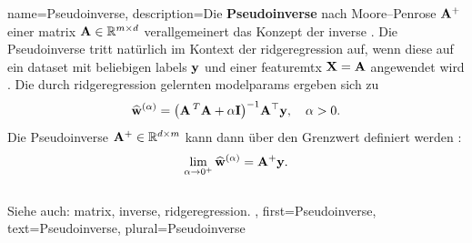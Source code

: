 \makeglossaries


{name={Pseudoinverse},
  description={Die \textbf{Pseudoinverse} nach Moore–Penrose ${\bf A}^{+}$ 
  	einer \gls{matrix} ${\bf A} \in \mathbb{R}^{m \times d}$ verallgemeinert das Konzept der 
  	\gls{inverse} \cite{GolubVanLoanBook}. Die Pseudoinverse\cite{unikassel} tritt natürlich im Kontext der 
  	\gls{ridgeregression} auf, wenn diese auf ein \gls{dataset} mit beliebigen \glspl{label} ${\bf y}$ 
  	und einer \gls{featuremtx} ${\bf X} = {\bf A}$ angewendet wird \cite[Kap.\ 3]{hastie01statisticallearning}. 
  	Die durch \gls{ridgeregression} gelernten \glspl{modelparam} ergeben sich zu
  	\[
  	\widehat{{\bf w}}^{(\alpha)}  = \big({\bf A}\,^{T} {\bf A} + \alpha \mathbf{I} \big)^{-1} {\bf A}^\top {\bf y}, \quad \alpha > 0.
  	\]
  	Die Pseudoinverse ${\bf A}^+ \in \mathbb{R}^{d \times m}$ kann dann über den Grenzwert definiert werden \cite[Kap. 3]{benisrael2003generalized}:
  	\[
  	\lim_{\alpha \to 0^+} \widehat{{\bf w}}^{(\alpha)} = {\bf A}^+ {\bf y}.
  	\]
  	\\
  	Siehe auch: \gls{matrix}, \gls{inverse}, \gls{ridgeregression}.
  },
 first={Pseudoinverse},
 text={Pseudoinverse}, 
 plural={Pseudoinverse}
}


